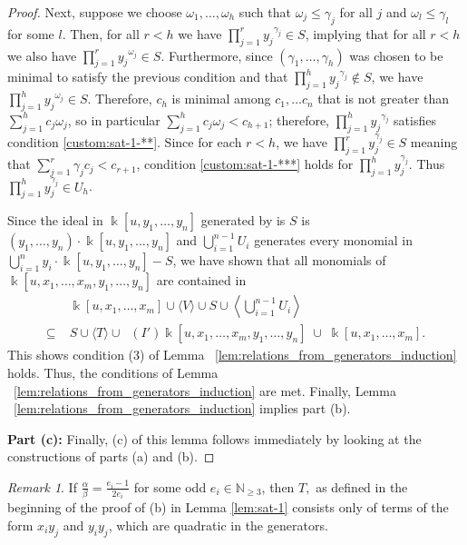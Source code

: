 \documentclass{amsart}
\theoremstyle{plain}
\theoremstyle{definition}
\theoremstyle{remark}
\newtheorem{rem}[thm]{Remark}
\numberwithin{equation}{section}
\newcommand\BN{{\mathbb N}}
\newcommand\Bk{{\Bbbk}}
\DeclareMathOperator{\initial}{in_\prec}
\begin{document}
\begin{proof}
Next, suppose we choose $\omega_1, \ldots, \omega_h$ such that $\omega_j\le \gamma_j$ for all $j$ and $\omega_l \le \gamma_l$ for some $l$.  Then, for all $r< h$ we have $\prod_{j=1}^r {y_j}^{\gamma_j}\in S$, implying that for all $r< h$ we also have $\prod_{j=1}^r {y_j}^{\omega_j}\in S$.  Furthermore, since $(\gamma_1, \ldots, \gamma_h)$ was chosen to be minimal to satisfy the previous condition and that $\prod_{j=1}^h {y_j}^{\gamma_j}\not\in S$, we have $\prod_{j=1}^h {y_j}^{\omega_j}\in S$.  Therefore, $c_h$ is minimal among $c_1, \ldots c_n$ that is not greater than $\sum_{j=1}^h c_j \omega_j$, so in particular $\sum_{j=1}^h c_j\omega_j < c_{h+1}$; therefore, $\prod_{j=1}^h {y_j}^{\gamma_j}$ satisfies condition \ref{custom:sat-1-**}.  
Since for each $r<h$, we have $\prod_{j=1}^r y_{j}^{\gamma_j}\in S$ meaning that $\sum_{j=1}^r \gamma_j c_j < c_{r+1}$, condition \ref{custom:sat-1-***} holds for $\prod_{j=1}^h y_j^{\gamma_j}$.  
Thus $\prod_{j=1}^h y_j^{\gamma_j}\in U_{h}$.

Since the ideal in $\Bk[u, y_1, \ldots, y_n]$ generated by is $S$ is $(y_1, \ldots, y_n) \cdot \Bk[u, y_1, \ldots, y_n]$ and $\bigcup_{i=1}^{n-1} U_i$ generates every monomial in $\bigcup_{i=1}^n y_i \cdot \Bk[u, y_1, \ldots, y_n]-S$, we have shown that all monomials of $\Bk[u, x_1, \ldots, x_m, y_1, \ldots, y_n]$ are contained in
\begin{align*}
				& \Bk[u, x_1, \ldots, x_m] \cup \langle V \rangle \cup S \cup \left\langle \bigcup_{i=1}^{n-1} U_i \right\rangle \\
	\subseteq \; 	& S \cup \langle T\rangle \cup \initial(I') \Bk[u, x_1, \ldots, x_m, y_1, \ldots, y_n] \; \cup \; \Bk[u, x_1, \ldots, x_m].
\end{align*}
This shows condition (3) of Lemma ~\ref{lem:relations_from_generators_induction} holds.  Thus, the conditions of 
Lemma ~\ref{lem:relations_from_generators_induction} are met. Finally, Lemma ~\ref{lem:relations_from_generators_induction} implies part (b).

{\bf Part (c):}
Finally, (c) of this lemma follows immediately by looking at the constructions of parts (a) and (b).  
\end{proof}

\begin{rem}\label{rem:quad-gen}
If $\frac{\alpha}{\beta}=\frac{e_i-1}{2 e_i}$ for some odd $e_i \in \BN_{\geq 3}$, then $T,$ as defined in the beginning of the proof of (b) in Lemma \ref{lem:sat-1} consists only of terms of the form $x_i y_j$ and $y_i y_j$, which are quadratic in the generators.
\end{rem}
\end{document}
